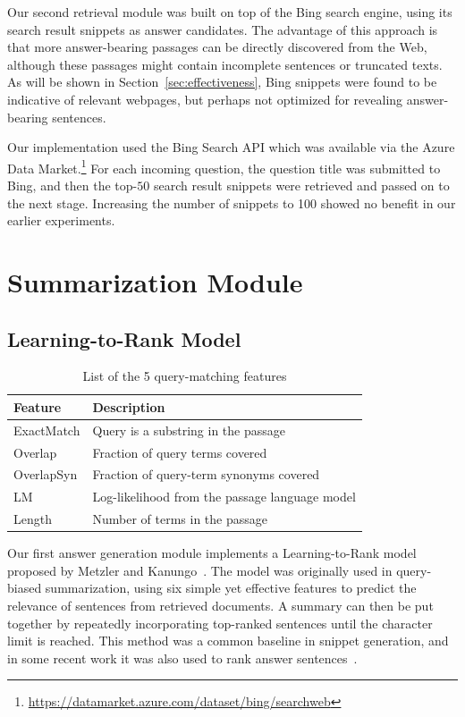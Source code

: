 \documentclass[a4paper,10pt,conference,compsocconf,final]{IEEEtran}
\newcommand{\shane}[1]{\textrm{\textcolor{orange}{Shane says: #1}}}
\newcommand{\ruey}[1]{\textrm{\textcolor{red}{Ruey says: #1}}}
\begin{document}
Our second retrieval module was built on top of the Bing search engine, using
its search result snippets as answer candidates.  The advantage of this
approach is that more answer-bearing passages can be directly discovered from
the Web, although these passages might contain incomplete sentences or
truncated texts.  As will be shown in Section~\ref{sec:effectiveness}, Bing
snippets were found to be indicative of relevant webpages, but perhaps not
optimized for revealing answer-bearing sentences.

Our implementation used the Bing Search API which was available via
the Azure Data
Market.\footnote{\url{https://datamarket.azure.com/dataset/bing/searchweb}}
For each incoming question, the question title was submitted to Bing,
and then the top-$50$ search result snippets were retrieved and
passed on to the next stage.
Increasing the number of snippets to 100 showed no benefit in our
earlier experiments.

\section{Summarization Module}
\label{sec:sum}

\subsection{Learning-to-Rank Model}\label{sec:ltr}

\begin{table}
\centering
\caption{List of the 5 query-matching features}\label{tbl:features}
\begin{tabular}{ll}
\toprule
\bf Feature & \bf Description \\
\midrule
ExactMatch & Query is a substring in the passage \\
Overlap & Fraction of query terms covered \\
OverlapSyn & Fraction of query-term synonyms covered \\
LM & Log-likelihood from the passage language model \\
Length & Number of terms in the passage \\
\bottomrule
\end{tabular}
\end{table}

Our first answer generation module implements a Learning-to-Rank
model proposed by Metzler and Kanungo~\cite{metzler_machine_2008}.
The model was originally used in query-biased summarization, using
six simple yet effective features to predict the relevance of
sentences from retrieved documents.
A summary can then be put together by repeatedly incorporating
top-ranked sentences until the character limit is reached.
This method was a common baseline in snippet generation, and in some
recent work it was also used to rank
answer sentences~{\cite{yang_beyond_2016}}.
\end{document}
